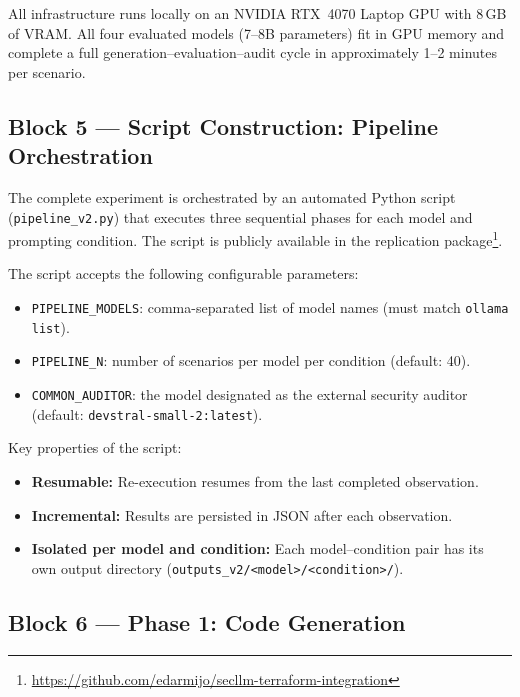 All infrastructure runs locally on an NVIDIA RTX~4070 Laptop GPU
with 8\,GB of VRAM. All four evaluated models (7--8B parameters)
fit in GPU memory and complete a full generation--evaluation--audit
cycle in approximately 1--2 minutes per scenario.

\subsection{Block 5 --- Script Construction: Pipeline Orchestration}
\label{sec:block5}

The complete experiment is orchestrated by an automated Python
script (\texttt{pipeline\_v2.py}) that executes three sequential
phases for each model and prompting condition. The script is
publicly available in the replication
package\footnote{\url{https://github.com/edarmijo/secllm-terraform-integration}}.

The script accepts the following configurable parameters:
\begin{itemize}[leftmargin=*]
    \item \texttt{PIPELINE\_MODELS}: comma-separated list of model
          names (must match \texttt{ollama list}).
    \item \texttt{PIPELINE\_N}: number of scenarios per model per
          condition (default: 40).
    \item \texttt{COMMON\_AUDITOR}: the model designated as the
          external security auditor (default:
          \texttt{devstral-small-2:latest}).
\end{itemize}

Key properties of the script:
\begin{itemize}[leftmargin=*]
    \item \textbf{Resumable:} Re-execution resumes from the last
          completed observation.
    \item \textbf{Incremental:} Results are persisted in JSON after
          each observation.
    \item \textbf{Isolated per model and condition:} Each
          model--condition pair has its own output directory
          (\texttt{outputs\_v2/<model>/<condition>/}).
\end{itemize}

\subsection{Block 6 --- Phase 1: Code Generation}
\label{sec:block6}

